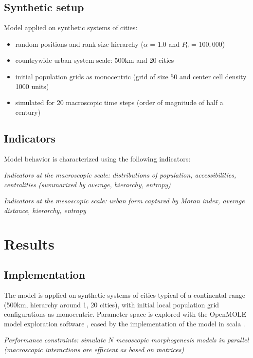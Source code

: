 \documentclass[11pt]{article}
\begin{document}
\subsection{Synthetic setup}

Model applied on synthetic systems of cities:


\begin{itemize}
	\item random positions and rank-size hierarchy ($\alpha \textrm{ = } 1.0$ and $P_0 \textrm{ = } 100,000$)
	\item countrywide urban system scale: 500km and 20 cities
	\item initial population grids as monocentric (grid of size 50 and center cell density 1000 units)
	\item simulated for 20 macroscopic time steps (order of magnitude of half a century)
\end{itemize}



\subsection{Indicators}

Model behavior is characterized using the following indicators:

\textit{Indicators at the macroscopic scale: distributions of population, accessibilities, centralities (summarized by average, hierarchy, entropy)}

\textit{Indicators at the mesoscopic scale: urban form captured by Moran index, average distance, hierarchy, entropy}



\section{Results}

\subsection{Implementation}

The model is applied on synthetic systems of cities typical of a continental range (500km, hierarchy around 1, 20 cities), with initial local population grid configurations as monocentric. Parameter space is explored with the OpenMOLE model exploration software \cite{reuillon2013openmole}, eased by the implementation of the model in scala \cite{model}.


\textit{Performance constraints: simulate $N$ mesoscopic morphogenesis models in parallel (macroscopic interactions are efficient as based on matrices)}
\end{document}
